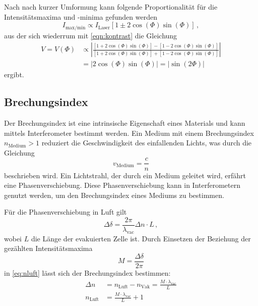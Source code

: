 Nach nach kurzer Umformung kann 
folgende Proportionalität für die Intensitätsmaxima und -minima gefunden werden
\begin{equation*}
    I_\text{max/min} \propto I_\text{Laser} \left[ 1 \pm 2 \cos(\Phi) \sin (\Phi) \right] \, ,
\end{equation*}
aus der sich wiederrum mit \autoref{eqn:kontrast} die Gleichung
\begin{align}\label{eqn:kontrast2}
    V = V(\Phi) &\propto \left|\frac{\left[ 1 + 2 \cos(\Phi) \sin (\Phi) \right] - \left[ 1 - 2 \cos(\Phi) \sin (\Phi) \right]}{\left[ 1 + 2 \cos(\Phi) \sin (\Phi) \right] + \left[ 1 - 2 \cos(\Phi) \sin (\Phi) \right]}\right| \\
    &= \left|2 \cos(\Phi) \sin(\Phi) \right| = \left| \sin (2 \Phi) \right|
\end{align}
ergibt. %
\subsection{Brechungsindex} \label{sec:n}

Der Brechungsindex ist eine intrinsische Eigenschaft eines Materials und kann mittels Interferometer bestimmt werden. Ein Medium mit einem Brechungsindex $n_\text{Medium} > 1$ reduziert die Geschwindigkeit des einfallenden Lichts, was durch die Gleichung
\begin{equation*}
    v_\text{Medium} = \frac{c}{n}
\end{equation*}
beschrieben wird. Ein Lichtstrahl, der durch ein Medium geleitet wird, erfährt eine Phasenverschiebung. Diese Phasenverschiebung kann in Interferometern genutzt werden, um den Brechungsindex eines Mediums zu bestimmen.

Für die Phasenverschiebung in Luft gilt
\begin{equation} \label{eq:nluft}
    \Delta \delta = \frac{2 \pi}{\lambda_\text{vac}} \Delta n \cdot L \, ,
\end{equation}
wobei $L$ die Länge der evakuierten Zelle ist. Durch Einsetzen der Beziehung der gezählten Intensitätsmaxima 
\begin{equation} \label{eq:maxima}
    M = \frac{\Delta \delta}{2 \pi}
\end{equation}
in \autoref{eq:nluft} lässt sich der Brechungsindex bestimmen:
\begin{align} \label{eq:nluft2}
    \Delta n &= n_\text{Luft} - n_\text{Vak} = \frac{M \cdot \lambda_\text{vac}}{L} \nonumber \\
    n_\text{Luft} &= \frac{M \cdot \lambda_\text{vac}}{L} + 1
\end{align}

